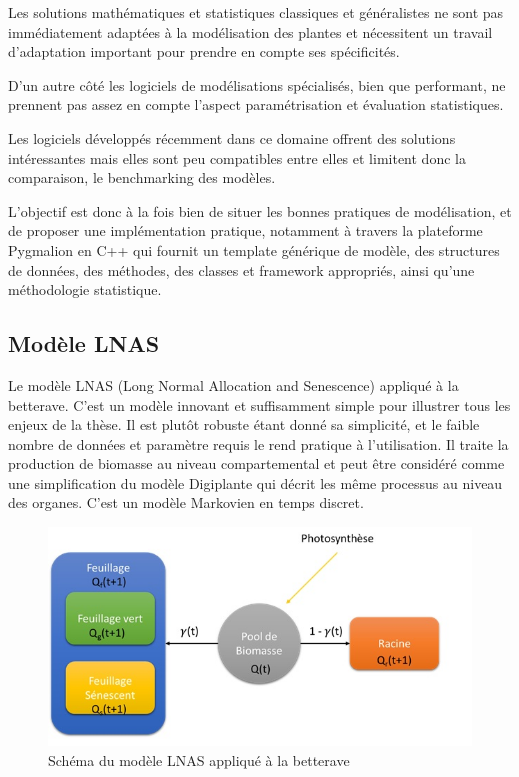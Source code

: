 Les solutions mathématiques et statistiques classiques et généralistes ne sont pas immédiatement adaptées à la modélisation des plantes et nécessitent un travail d’adaptation important pour prendre en compte ses spécificités.

D’un autre côté les logiciels de modélisations spécialisés, bien que performant, ne prennent pas assez en compte l’aspect paramétrisation et évaluation statistiques.

Les logiciels développés récemment dans ce domaine offrent des solutions intéressantes mais elles sont peu compatibles entre elles et limitent donc la comparaison, le benchmarking des modèles.

L’objectif est donc à la fois bien de situer les bonnes pratiques de modélisation, et de proposer une implémentation pratique, notamment à travers la plateforme Pygmalion en C++ qui fournit un template générique de modèle, des structures de données, des méthodes, des classes et framework appropriés, ainsi qu’une méthodologie statistique.

\subsection{Modèle LNAS}

Le modèle LNAS (Long Normal Allocation and Senescence) appliqué à la betterave. C’est un modèle innovant et suffisamment simple pour illustrer tous les enjeux de la thèse. Il est plutôt robuste étant donné sa simplicité, et le faible nombre de données et paramètre requis le rend pratique à l’utilisation. Il traite la production de biomasse au niveau compartemental et peut être considéré comme une simplification du modèle Digiplante qui décrit les même processus au niveau des organes.
C’est un modèle Markovien en temps discret.

\begin{figure}[h]
	\begin{center}
	
	
  \includegraphics[scale=1.0]{./img/sBeetRoot.jpg}
  \caption{Schéma du modèle LNAS appliqué à la betterave}
  \label{fig:sBeetRoot}
  
  \end{center}
\end{figure}

